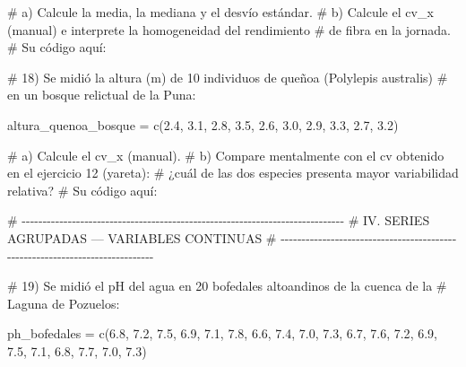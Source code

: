 \documentclass[
  spanish,
  letterpaper,
  DIV=11,
  numbers=noendperiod]{scrreprt}
\newenvironment{Shaded}{\begin{snugshade}}{\end{snugshade}}
\newcommand{\CommentTok}[1]{\textcolor[rgb]{0.37,0.37,0.37}{#1}}
\newcommand{\FloatTok}[1]{\textcolor[rgb]{0.68,0.00,0.00}{#1}}
\newcommand{\FunctionTok}[1]{\textcolor[rgb]{0.28,0.35,0.67}{#1}}
\newcommand{\NormalTok}[1]{\textcolor[rgb]{0.00,0.23,0.31}{#1}}
\newcommand{\OtherTok}[1]{\textcolor[rgb]{0.00,0.23,0.31}{#1}}
\begin{document}
\begin{Shaded}
\begin{Highlighting}[]
\CommentTok{\#     a) Calcule la media, la mediana y el desvío estándar.}
\CommentTok{\#     b) Calcule el cv\_x (manual) e interprete la homogeneidad del rendimiento}
\CommentTok{\#        de fibra en la jornada.}
\CommentTok{\# Su código aquí:}


\CommentTok{\# 18) Se midió la altura (m) de 10 individuos de queñoa (Polylepis australis)}
\CommentTok{\#     en un bosque relictual de la Puna:}

\NormalTok{altura\_quenoa\_bosque }\OtherTok{=} \FunctionTok{c}\NormalTok{(}\FloatTok{2.4}\NormalTok{, }\FloatTok{3.1}\NormalTok{, }\FloatTok{2.8}\NormalTok{, }\FloatTok{3.5}\NormalTok{, }\FloatTok{2.6}\NormalTok{, }\FloatTok{3.0}\NormalTok{, }\FloatTok{2.9}\NormalTok{, }\FloatTok{3.3}\NormalTok{, }\FloatTok{2.7}\NormalTok{, }\FloatTok{3.2}\NormalTok{)}

\CommentTok{\#     a) Calcule el cv\_x (manual).}
\CommentTok{\#     b) Compare mentalmente con el cv obtenido en el ejercicio 12 (yareta):}
\CommentTok{\#        ¿cuál de las dos especies presenta mayor variabilidad relativa?}
\CommentTok{\# Su código aquí:}


\CommentTok{\# {-}{-}{-}{-}{-}{-}{-}{-}{-}{-}{-}{-}{-}{-}{-}{-}{-}{-}{-}{-}{-}{-}{-}{-}{-}{-}{-}{-}{-}{-}{-}{-}{-}{-}{-}{-}{-}{-}{-}{-}{-}{-}{-}{-}{-}{-}{-}{-}{-}{-}{-}{-}{-}{-}{-}{-}{-}{-}{-}{-}{-}{-}{-}{-}{-}{-}{-}{-}{-}{-}{-}{-}{-}{-}{-}{-}{-}}
\CommentTok{\# IV. SERIES AGRUPADAS — VARIABLES CONTINUAS}
\CommentTok{\# {-}{-}{-}{-}{-}{-}{-}{-}{-}{-}{-}{-}{-}{-}{-}{-}{-}{-}{-}{-}{-}{-}{-}{-}{-}{-}{-}{-}{-}{-}{-}{-}{-}{-}{-}{-}{-}{-}{-}{-}{-}{-}{-}{-}{-}{-}{-}{-}{-}{-}{-}{-}{-}{-}{-}{-}{-}{-}{-}{-}{-}{-}{-}{-}{-}{-}{-}{-}{-}{-}{-}{-}{-}{-}{-}{-}{-}}

\CommentTok{\# 19) Se midió el pH del agua en 20 bofedales altoandinos de la cuenca de la}
\CommentTok{\#     Laguna de Pozuelos:}

\NormalTok{ph\_bofedales }\OtherTok{=} \FunctionTok{c}\NormalTok{(}\FloatTok{6.8}\NormalTok{, }\FloatTok{7.2}\NormalTok{, }\FloatTok{7.5}\NormalTok{, }\FloatTok{6.9}\NormalTok{, }\FloatTok{7.1}\NormalTok{, }\FloatTok{7.8}\NormalTok{, }\FloatTok{6.6}\NormalTok{, }\FloatTok{7.4}\NormalTok{, }\FloatTok{7.0}\NormalTok{, }\FloatTok{7.3}\NormalTok{,}
                  \FloatTok{6.7}\NormalTok{, }\FloatTok{7.6}\NormalTok{, }\FloatTok{7.2}\NormalTok{, }\FloatTok{6.9}\NormalTok{, }\FloatTok{7.5}\NormalTok{, }\FloatTok{7.1}\NormalTok{, }\FloatTok{6.8}\NormalTok{, }\FloatTok{7.7}\NormalTok{, }\FloatTok{7.0}\NormalTok{, }\FloatTok{7.3}\NormalTok{)}


\end{Highlighting}
\end{Shaded}
\end{document}
